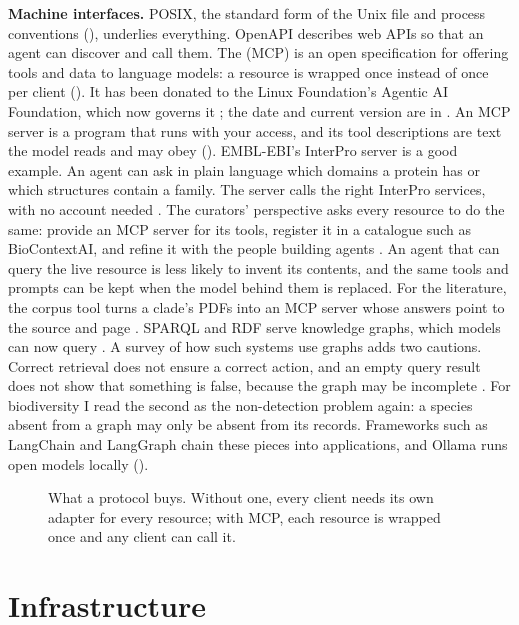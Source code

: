 \textbf{Machine interfaces.} POSIX, the standard form of the Unix file and
process conventions (), underlies everything. OpenAPI
describes web APIs so that an agent can discover and call them. The
 (MCP) is an open specification for offering tools
and data to language models: a resource is wrapped once instead of once per
client (). It has been donated to the Linux Foundation's Agentic
AI Foundation, which now governs it \parencite{liu2026claudecode}; the date and
current version are in . An MCP server is a program that
runs with your access, and its tool descriptions are text the model reads and
may obey (). EMBL-EBI's InterPro server is a good
example. An agent can ask in plain language which domains a protein has or
which structures contain a family. The server calls the right InterPro services,
with no account needed \parencite{interpro2026mcp}. The curators' perspective
asks every resource to do the same: provide an MCP server for its tools,
register it in a catalogue such as BioContextAI, and refine it with the people
building agents \parencite{pombase2026curation}. An agent that can query the
live resource is less likely to invent its contents, and the same tools and
prompts can be kept when the model behind them is replaced. For the literature, the corpus
tool turns a clade's PDFs into an MCP server whose answers point to the source and
page \parencite{church2026corpus}. SPARQL and RDF serve
knowledge graphs, which models can now query \parencite{smeros2025sparqlllm}.
A survey of how such systems use graphs adds two cautions. Correct retrieval
does not ensure a correct action, and an empty query result does not show that
something is false, because the graph may be incomplete \parencite{liu2026graphllm}.
For biodiversity I read the second as the non-detection problem again: a
species absent from a graph may only be absent from its records. Frameworks such as LangChain and LangGraph chain these pieces into applications,
and Ollama runs open models locally ().

\begin{figure}[htbp]
\centering
{}
\caption{What a protocol buys. Without one, every client needs its own adapter
for every resource; with MCP, each resource is wrapped once and any client can
call it.}
\label{fig:mcp}
\end{figure}

\section{Infrastructure}

